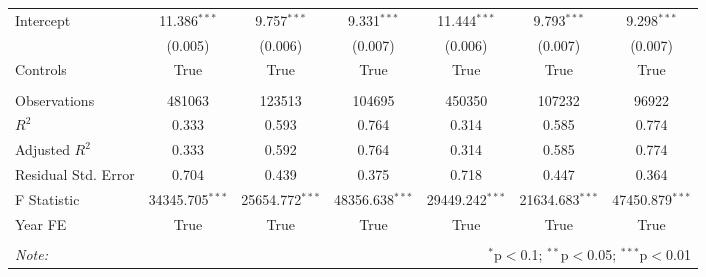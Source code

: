 \begin{tabular}{@{\extracolsep{5pt}}lcccccc}
Intercept & 11.386$^{***}$ & 9.757$^{***}$ & 9.331$^{***}$ & 11.444$^{***}$ & 9.793$^{***}$ & 9.298$^{***}$ \\
& (0.005) & (0.006) & (0.007) & (0.006) & (0.007) & (0.007) \\
Controls & True & True & True & True & True & True \\
\hline \\[-1.8ex]
 Observations & 481063 & 123513 & 104695 & 450350 & 107232 & 96922 \\
 $R^2$ & 0.333 & 0.593 & 0.764 & 0.314 & 0.585 & 0.774 \\
 Adjusted $R^2$ & 0.333 & 0.592 & 0.764 & 0.314 & 0.585 & 0.774 \\
 Residual Std. Error & 0.704  & 0.439  & 0.375  & 0.718  & 0.447  & 0.364  \\
 F Statistic & 34345.705$^{***}$  & 25654.772$^{***}$  & 48356.638$^{***}$  & 29449.242$^{***}$  & 21634.683$^{***}$  & 47450.879$^{***}$  \\
    Year FE & True & True & True & True & True & True \\
\hline
\hline \\[-1.8ex]
\textit{Note:} & \multicolumn{6}{r}{$^{*}$p$<$0.1; $^{**}$p$<$0.05; $^{***}$p$<$0.01} \\
\end{tabular}
